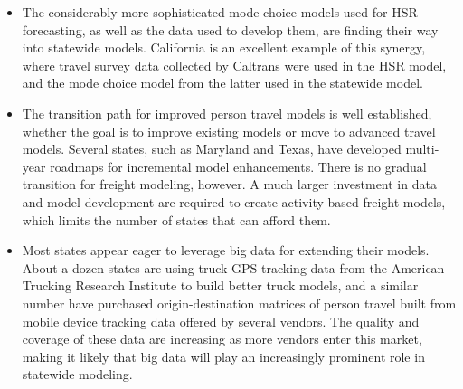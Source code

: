 \begin{itemize}
\item The considerably more sophisticated mode choice models used for HSR forecasting, as well as the data used to develop them, are finding their way into statewide models. California is an excellent example of this synergy, where travel survey data collected by Caltrans were used in the HSR model, and the mode choice model from the latter used in the statewide model. 
\item The transition path for improved person travel models is well established, whether the goal is to improve existing models or move to advanced travel models. Several states, such as Maryland and Texas, have developed multi-year roadmaps for incremental model enhancements. There is no gradual transition for freight modeling, however. A much larger investment in data and model development are required to create activity-based freight models, which limits the number of states that can afford them.
\item Most states appear eager to leverage big data for extending their models. About a dozen states are using truck GPS tracking data from the American Trucking Research Institute to build better truck models, and a similar number have purchased origin-destination matrices of person travel built from mobile device tracking data offered by several vendors. The quality and coverage of these data are increasing as more vendors enter this market, making it likely that big data will play an increasingly prominent role in statewide modeling.
\end{itemize}

